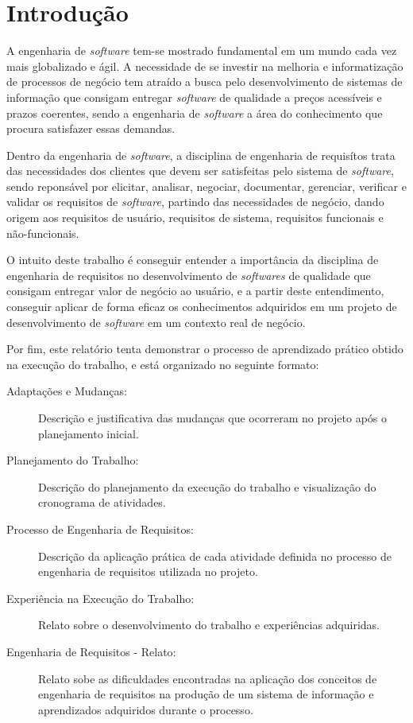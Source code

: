 \chapter{Introdução}

A engenharia de \emph{software} tem-se mostrado fundamental em um mundo cada vez mais globalizado e ágil. A necessidade de se investir na melhoria e informatização de processos de negócio tem atraído a busca pelo desenvolvimento de sistemas de informação que consigam entregar \emph{software} de qualidade a preços acessíveis e prazos coerentes, sendo a engenharia de \emph{software} a área do conhecimento que procura satisfazer essas demandas.

Dentro da engenharia de \emph{software}, a disciplina de engenharia de requisítos trata das necessidades dos clientes que devem ser satisfeitas pelo sistema de \emph{software}, sendo reponsável por elicitar, analisar, negociar, documentar, gerenciar, verificar e validar os requisitos de \emph{software}, partindo das necessidades de negócio, dando origem aos requisitos  de usuário, requisitos de sistema, requisitos funcionais e não-funcionais.

O intuito deste trabalho é conseguir entender a importância da disciplina de engenharia de requisitos no desenvolvimento de \emph{softwares} de qualidade que consigam entregar valor de negócio ao usuário, e a partir deste entendimento, conseguir aplicar de forma eficaz os conhecimentos adquiridos em um projeto de desenvolvimento de \emph{software} em um contexto real de negócio.

Por fim, este relatório tenta demonstrar o processo de aprendizado prático obtido na execução do trabalho, e está organizado no seguinte formato:

\begin{description}
  \item [Adaptações e Mudanças:] Descrição e justificativa das mudanças que ocorreram no projeto após o planejamento inicial.
  \item [Planejamento do Trabalho:] Descrição do planejamento da execução do trabalho e visualização do cronograma de atividades.
  \item [Processo de Engenharia de Requisitos:] Descrição da aplicação prática de cada atividade definida no processo de engenharia de requisitos utilizada no projeto.
  \item [Experiência na Execução do Trabalho:] Relato sobre o desenvolvimento do trabalho e experiências adquiridas.
  \item [Engenharia de Requisitos - Relato:] Relato sobe as dificuldades encontradas na aplicação dos conceitos de engenharia de requisitos na produção de um sistema de informação e aprendizados adquiridos durante o processo.
\end{description}
